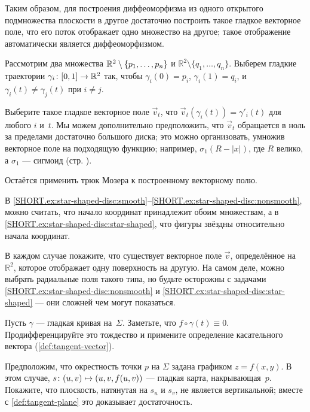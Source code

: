 Таким образом, для построения диффеоморфизма из одного открытого подмножества плоскости в другое достаточно построить такое гладкое векторное поле, что его поток отображает одно множество на другое;
такое отображение автоматически является диффеоморфизмом.


Рассмотрим два множества $\mathbb{R}^2\z\setminus\{p_1,\dots,p_n\}$ и $\mathbb{R}^2\setminus\{q_1,\dots,q_n\}$.
Выберем гладкие траектории $\gamma_i\:[0,1]\z\to \mathbb{R}^2$ так, чтобы $\gamma_i(0)=p_i$,
$\gamma_i(1)=q_i$, и $\gamma_i(t)\ne \gamma_j(t)$ при $i\ne j$.

Выберите такое гладкое векторное поле $\vec v_t$, что $\vec v_t(\gamma_i(t))=\gamma'_i(t)$ для любого $i$ и~$t$.
Мы можем дополнительно предположить, что $\vec v_t$ обращается в ноль за пределами достаточно большого диска; это можно организовать, умножив векторное поле на подходящую функцию;
например, $\sigma_1(R-|x|)$, где $R$ велико, а $\sigma_1$ --- сигмоид (стр. \pageref{page:sigma-function}).

Остаётся применить трюк Мозера к построенному векторному полю.

В \ref{SHORT.ex:star-shaped-disc:smooth}--\ref{SHORT.ex:star-shaped-disc:nonsmooth}, можно считать, что начало координат принадлежит обоим множествам, а в \ref{SHORT.ex:star-shaped-disc:star-shaped}, что фигуры звёздны относительно начала координат.

В каждом случае покажите, что существует векторное поле $\vec v$, определённое на $\mathbb{R}^2$, которое отображает одну поверхность на другую.
На самом деле, можно выбрать радиальные поля такого типа,
но будьте осторожны с задачами \ref{SHORT.ex:star-shaped-disc:nonsmooth} и \ref{SHORT.ex:star-shaped-disc:star-shaped} --- они сложней чем могут показаться.



\setcounter{eqtn}{0}

Пусть $\gamma$ --- гладкая кривая на~$\Sigma$.
Заметьте, что $f\circ\gamma(t)\equiv 0$.
Продифференцируйте это тождество и примените определение касательного вектора (\ref{def:tangent-vector}).

Предположим, что окрестность точки $p$ на $\Sigma$ задана графиком $z=f(x,y)$.
В этом случае, $s\:(u,v)\z\mapsto (u,v,f(u,v))$ --- гладкая карта, накрывающая~$p$.
Покажите, что плоскость, натянутая на $s_u$ и $s_v$, не является вертикальной;
вместе с \ref{def:tangent-plane} это доказывает достаточность.

